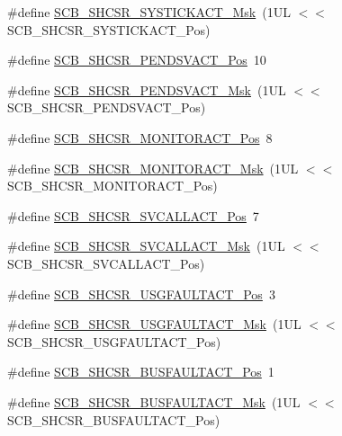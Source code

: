 \begin{DoxyCompactItemize}
\item 
\#define \hyperlink{group___c_m_s_i_s___s_c_b_gafef530088dc6d6bfc9f1893d52853684}{S\-C\-B\-\_\-\-S\-H\-C\-S\-R\-\_\-\-S\-Y\-S\-T\-I\-C\-K\-A\-C\-T\-\_\-\-Msk}~(1\-U\-L $<$$<$ S\-C\-B\-\_\-\-S\-H\-C\-S\-R\-\_\-\-S\-Y\-S\-T\-I\-C\-K\-A\-C\-T\-\_\-\-Pos)
\item 
\#define \hyperlink{group___c_m_s_i_s___s_c_b_ga9b9fa69ce4c5ce7fe0861dbccfb15939}{S\-C\-B\-\_\-\-S\-H\-C\-S\-R\-\_\-\-P\-E\-N\-D\-S\-V\-A\-C\-T\-\_\-\-Pos}~10
\item 
\#define \hyperlink{group___c_m_s_i_s___s_c_b_gae0e837241a515d4cbadaaae1faa8e039}{S\-C\-B\-\_\-\-S\-H\-C\-S\-R\-\_\-\-P\-E\-N\-D\-S\-V\-A\-C\-T\-\_\-\-Msk}~(1\-U\-L $<$$<$ S\-C\-B\-\_\-\-S\-H\-C\-S\-R\-\_\-\-P\-E\-N\-D\-S\-V\-A\-C\-T\-\_\-\-Pos)
\item 
\#define \hyperlink{group___c_m_s_i_s___s_c_b_ga8b71cf4c61803752a41c96deb00d26af}{S\-C\-B\-\_\-\-S\-H\-C\-S\-R\-\_\-\-M\-O\-N\-I\-T\-O\-R\-A\-C\-T\-\_\-\-Pos}~8
\item 
\#define \hyperlink{group___c_m_s_i_s___s_c_b_gaad09b4bc36e9bccccc2e110d20b16e1a}{S\-C\-B\-\_\-\-S\-H\-C\-S\-R\-\_\-\-M\-O\-N\-I\-T\-O\-R\-A\-C\-T\-\_\-\-Msk}~(1\-U\-L $<$$<$ S\-C\-B\-\_\-\-S\-H\-C\-S\-R\-\_\-\-M\-O\-N\-I\-T\-O\-R\-A\-C\-T\-\_\-\-Pos)
\item 
\#define \hyperlink{group___c_m_s_i_s___s_c_b_ga977f5176be2bc8b123873861b38bc02f}{S\-C\-B\-\_\-\-S\-H\-C\-S\-R\-\_\-\-S\-V\-C\-A\-L\-L\-A\-C\-T\-\_\-\-Pos}~7
\item 
\#define \hyperlink{group___c_m_s_i_s___s_c_b_ga634c0f69a233475289023ae5cb158fdf}{S\-C\-B\-\_\-\-S\-H\-C\-S\-R\-\_\-\-S\-V\-C\-A\-L\-L\-A\-C\-T\-\_\-\-Msk}~(1\-U\-L $<$$<$ S\-C\-B\-\_\-\-S\-H\-C\-S\-R\-\_\-\-S\-V\-C\-A\-L\-L\-A\-C\-T\-\_\-\-Pos)
\item 
\#define \hyperlink{group___c_m_s_i_s___s_c_b_gae06f54f5081f01ed3f6824e451ad3656}{S\-C\-B\-\_\-\-S\-H\-C\-S\-R\-\_\-\-U\-S\-G\-F\-A\-U\-L\-T\-A\-C\-T\-\_\-\-Pos}~3
\item 
\#define \hyperlink{group___c_m_s_i_s___s_c_b_gab3166103b5a5f7931d0df90949c47dfe}{S\-C\-B\-\_\-\-S\-H\-C\-S\-R\-\_\-\-U\-S\-G\-F\-A\-U\-L\-T\-A\-C\-T\-\_\-\-Msk}~(1\-U\-L $<$$<$ S\-C\-B\-\_\-\-S\-H\-C\-S\-R\-\_\-\-U\-S\-G\-F\-A\-U\-L\-T\-A\-C\-T\-\_\-\-Pos)
\item 
\#define \hyperlink{group___c_m_s_i_s___s_c_b_gaf272760f2df9ecdd8a5fbbd65c0b767a}{S\-C\-B\-\_\-\-S\-H\-C\-S\-R\-\_\-\-B\-U\-S\-F\-A\-U\-L\-T\-A\-C\-T\-\_\-\-Pos}~1
\item 
\#define \hyperlink{group___c_m_s_i_s___s_c_b_ga9d7a8b1054b655ad08d85c3c535d4f73}{S\-C\-B\-\_\-\-S\-H\-C\-S\-R\-\_\-\-B\-U\-S\-F\-A\-U\-L\-T\-A\-C\-T\-\_\-\-Msk}~(1\-U\-L $<$$<$ S\-C\-B\-\_\-\-S\-H\-C\-S\-R\-\_\-\-B\-U\-S\-F\-A\-U\-L\-T\-A\-C\-T\-\_\-\-Pos)

\end{DoxyCompactItemize}
